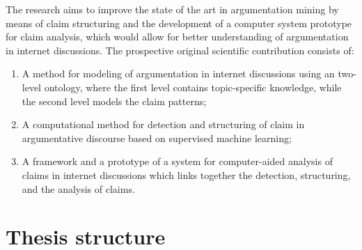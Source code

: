 The research aims to improve the state of
the art in argumentation mining by means of claim structuring and the
development of a computer system prototype for claim analysis, which would
allow for better understanding of argumentation in internet discussions. 
The prospective original scientific contribution consists of: 
\begin{enumerate}
\item A method for modeling of argumentation in internet discussions using an
two-level ontology, where the first level contains topic-specific knowledge,
while the second level models the claim patterns;
\item A computational method for detection and
structuring of claim in argumentative discourse based on supervised machine
learning;
\item A framework and a prototype of a system for computer-aided
analysis of claims in internet discussions which links together the detection,
structuring, and the analysis of claims.  
\end{enumerate}

\section{Thesis structure}
